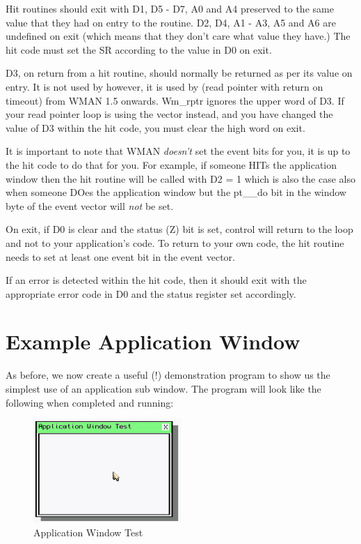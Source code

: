  
Hit routines should exit with D1, D5 -{} D7, A0 and A4 preserved to
    the same value that they had on entry to the routine. D2, D4, A1 -{} A3, A5
    and A6 are undefined on exit (which means that they don't care what value
    they have.) The hit code must set the SR according to the value in D0 on
    exit.

D3, on return from a hit routine, should normally be returned as per
    its value on entry. It is not used by  however, it is used by
     (read pointer with return on timeout) from
 WMAN 1.5 onwards. Wm\_rptr ignores the upper
    word of D3. If your read pointer loop is using the  vector
    instead, and you have changed the value of D3 within the hit code, you
    must clear the high word on exit.

It is important to note that WMAN  \emph{doesn't} set the event bits for you, it is up to the
    hit code to do that for you. For example, if someone HITs the application
    window then the hit routine will be called with D2 = 1 which is also the
    case also when someone DOes the application window but the pt\_\_do bit in
    the window byte of the event vector will \emph{not} be
    set.

On exit, if D0 is clear and the status (Z) bit is set, control will
    return to the  loop and not to your application's code. To return
    to your own code, the hit routine needs to set at least one event bit in
    the event vector.

If an error is detected within the hit code, then it should exit
    with the appropriate error code in D0 and the status register set
    accordingly.

\section{Example Application Window}
\label{ch27-example-appl-wins}%

As before, we now create a useful (!) demonstration program to show
    us the simplest use of an application sub window. The program will look
    like the following when completed and running:

\begin{figure}[h]
\center
\includegraphics[width=0.5\textwidth]{Content/images/ApplTest_1.png}
\caption{Application Window Test}
\label{fig:ApplicationWindowTest}
\end{figure}

